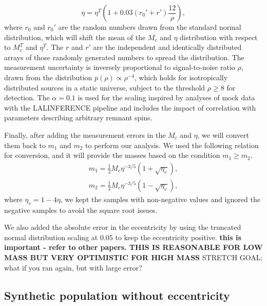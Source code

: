 \documentclass[twocolumn,prd,nofootinbib]{revtex4}
\begin{document}
\begin{equation}
\eta = \eta^T\left( 1+0.03 (r_0'+r') \frac{12}{\rho}\right),   
\end{equation}
where $r_0$ and $r_0'$ are the random numbers drawn from the standard normal distribution, which will shift the mean of the $M_c$ and $\eta$ distribution with respect to $M_c^T$ and $\eta^T$. The $r$ and $r'$ are the independent and identically distributed arrays of those randomly generated numbers to spread the distribution. The measurement uncertainty is inversely proportional to signal-to-noise ratio $\rho$, drawn from the distribution $p(\rho) \propto \rho^{-4}$, which holds for isotropically distributed sources in a static universe, subject to the threshold $\rho\geq 8$ for detection. The $\alpha =0.1$ is used for the scaling inspired by analyses of mock data with the LALINFERENCE pipeline \cite{alpha_error_2015} and includes the impact of correlation with parameters describing arbitrary remnant spins.

Finally, after adding the measurement errors in the $M_c$ and $\eta$, we will convert them back to $m_1$ and $m_2$ to perform our analysis. We used the following relation for conversion, and it will provide the masses based on the condition $m_1\geq m_2$.
%
\begin{align}
    m_1 = \frac{1}{2} M_c \eta^{-3/5} (1+\sqrt{\eta_v}), \\
    m_2 = \frac{1}{2} M_c \eta^{-3/5} (1-\sqrt{\eta_v}), 
\end{align}
where $\eta_v = 1-4\eta$, we kept the samples with non-negative values and ignored the negative samples to avoid the square root issues. 

We also added the absolute error in the eccentricity by using the truncated normal distribution scaling at $0.05$ to keep the eccentricity positive.
\textbf{this is important - refer to other papers.  THIS IS REASONABLE FOR LOW MASS BUT VERY OPTIMISTIC FOR HIGH MASS}
STRETCH GOAL: what if you ran again, but with large error?








\subsection{Synthetic population without eccentricity}
\end{document}
